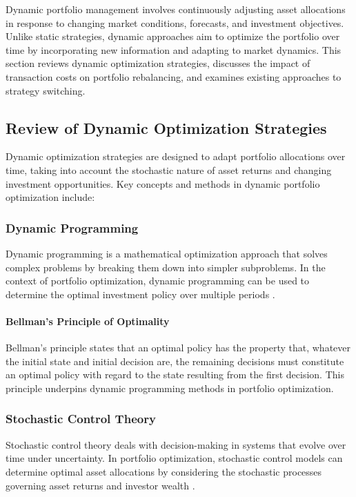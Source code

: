 Dynamic portfolio management involves continuously adjusting asset allocations in response to changing market conditions, forecasts, and investment objectives. Unlike static strategies, dynamic approaches aim to optimize the portfolio over time by incorporating new information and adapting to market dynamics. This section reviews dynamic optimization strategies, discusses the impact of transaction costs on portfolio rebalancing, and examines existing approaches to strategy switching.

\subsection{Review of Dynamic Optimization Strategies}

Dynamic optimization strategies are designed to adapt portfolio allocations over time, taking into account the stochastic nature of asset returns and changing investment opportunities. Key concepts and methods in dynamic portfolio optimization include:

\subsubsection{Dynamic Programming}

Dynamic programming is a mathematical optimization approach that solves complex problems by breaking them down into simpler subproblems. In the context of portfolio optimization, dynamic programming can be used to determine the optimal investment policy over multiple periods \cite{bellman1957dynamic}.

\paragraph{Bellman's Principle of Optimality}

Bellman's principle states that an optimal policy has the property that, whatever the initial state and initial decision are, the remaining decisions must constitute an optimal policy with regard to the state resulting from the first decision. This principle underpins dynamic programming methods in portfolio optimization.

\subsubsection{Stochastic Control Theory}

Stochastic control theory deals with decision-making in systems that evolve over time under uncertainty. In portfolio optimization, stochastic control models can determine optimal asset allocations by considering the stochastic processes governing asset returns and investor wealth \cite{merton1969lifetime}.

